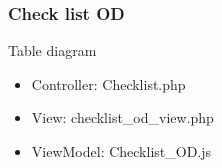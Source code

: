 \documentclass[letterpaper,10pt,english,openany,oneside]{sphinxmanual}
\begin{document}
\subsubsection{Check list OD}
\label{\detokenize{module/module:check-list-od}}
\sphinxAtStartPar
Table diagram

\begin{sphinxVerbatim}[commandchars=\\\{\}]
      
                                            
    
                                            
      
\end{sphinxVerbatim}
\begin{itemize}
\item {} 
\sphinxAtStartPar
Controller: Checklist.php

\item {} 
\sphinxAtStartPar
View: checklist\_od\_view.php

\item {} 
\sphinxAtStartPar
ViewModel: Checklist\_OD.js

\end{itemize}
\end{document}

